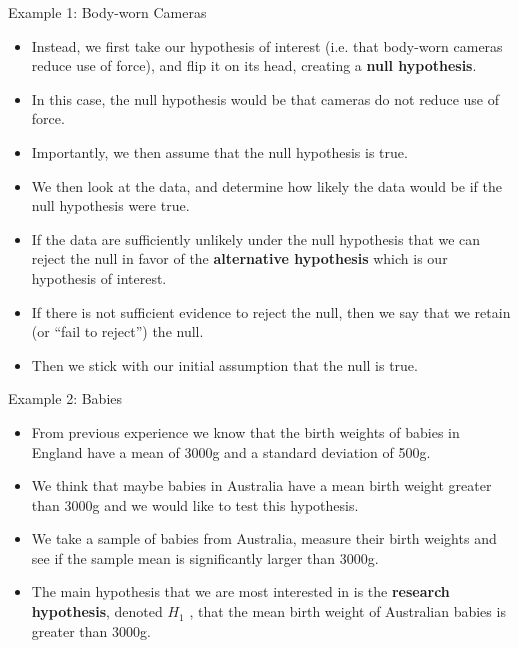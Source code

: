 \documentclass[handout]{beamer}
\begin{document}
\begin{frame}{Example 1: Body-worn Cameras}
\scriptsize{
\begin{itemize}
\item Instead, we first take our hypothesis of interest (i.e. that body-worn cameras reduce use of force), and flip it on its head, creating a \textbf{null hypothesis}.
\item In this case, the null hypothesis would be that cameras do not reduce use of force. 
\item Importantly, we then assume that the null hypothesis is true. 
\item We then look at the data, and determine how likely the data would be if the null hypothesis were true. 
\item If the data are sufficiently unlikely under the null hypothesis that we can reject the null in favor of the \textbf{alternative hypothesis} which is our hypothesis of interest. 
\item If there is not sufficient evidence to reject the null, then we say that we retain (or ``fail to reject'') the null.

\item Then we stick with our initial assumption that the null is true.
 
\end{itemize}


} 
\end{frame}



\begin{frame}{Example 2: Babies}
\scriptsize{
\begin{itemize}
  \item From previous experience we know that the birth weights of babies in England have a mean of 3000g and a standard deviation of 500g.
 \item We think that maybe babies in Australia have a mean birth weight greater than 3000g and we would like to test this hypothesis.
  \item We take a sample of babies from Australia, measure their birth weights and see if the sample mean is significantly larger than 3000g. 
    \item The main hypothesis that we are most interested in is the \textbf{research hypothesis}, denoted $H_1$ , that the mean birth weight of Australian babies is greater than 3000g.
\end{itemize}


} 
\end{frame}
\end{document}
